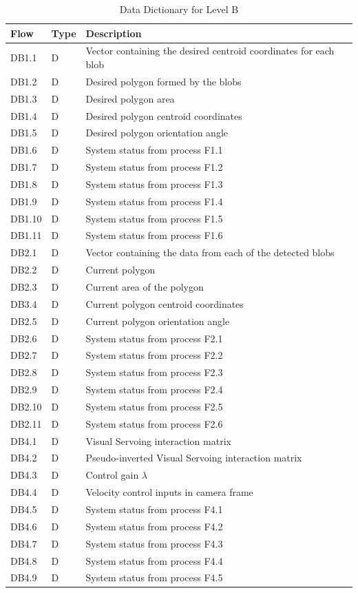 \begin{table}[!htb]
	\centering
	\begin{tabular}{lll}
		\toprule
		Flow & Type & Description \\
		\midrule
		DB1.1 & D & Vector containing the desired centroid coordinates for each blob\\
		DB1.2 & D & Desired polygon formed by the blobs \\
		DB1.3 & D & Desired polygon area \\
		DB1.4 & D & Desired polygon centroid coordinates\\
		DB1.5 & D & Desired polygon orientation angle \\
		DB1.6 & D & System status from process F1.1 \\
		DB1.7 & D & System status from process F1.2 \\
		DB1.8 & D & System status from process F1.3 \\
		DB1.9 & D & System status from process F1.4 \\
		DB1.10 & D & System status from process F1.5 \\
		DB1.11 & D & System status from process F1.6 \\
		\midrule
		DB2.1 & D & Vector containing the data from each of the detected blobs \\
		DB2.2 & D & Current polygon \\
		DB2.3 & D & Current area of the polygon \\
		DB3.4 & D & Current polygon centroid coordinates \\
		DB2.5 & D & Current polygon orientation angle \\
		DB2.6 & D & System status from process F2.1 \\
		DB2.7 & D & System status from process F2.2 \\
		DB2.8 & D & System status from process F2.3 \\
		DB2.9 & D & System status from process F2.4 \\
		DB2.10 & D & System status from process F2.5 \\
		DB2.11 & D & System status from process F2.6 \\
		\midrule
		DB4.1 & D & Visual Servoing interaction matrix \\
		DB4.2 & D & Pseudo-inverted Visual Servoing interaction matrix \\
		DB4.3 & D & Control gain $\lambda$ \\
		DB4.4 & D & Velocity control inputs in camera frame \\
		DB4.5 & D & System status from process F4.1 \\
		DB4.6 & D & System status from process F4.2 \\
		DB4.7 & D & System status from process F4.3 \\
		DB4.8 & D & System status from process F4.4 \\
		DB4.9 & D & System status from process F4.5 \\
		\bottomrule
	\end{tabular}
	\caption{Data Dictionary for Level B}
	\label{tab:DD-LB-a}
\end{table}

